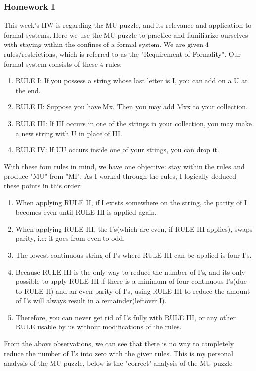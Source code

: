 \documentclass{article}
\theoremstyle{theorem}
\theoremstyle{definition}
\theoremstyle{remark}
\begin{document}
\subsubsection{Homework 1}
This week's HW is regarding the MU puzzle, and its relevance and application to formal systems. Here we use the MU puzzle to practice and familiarize ourselves with staying within the confines of a formal system. We are given 4 rules/restrictions, which is referred to as the "Requirement of Formality". 
Our formal system consists of these 4 rules:
\begin{enumerate}
    \item RULE I: If you possess a string whose last letter is I, you can add on a U at the end. 
    \item RULE II: Suppose you have Mx. Then you may add Mxx to your collection. 
    \item RULE III: If III occurs in one of the strings in your collection, you may make a new
string with U in place of III.
    \item RULE IV: If UU occurs inside one of your strings, you can drop it. 
\end{enumerate}
With these four rules in mind, we have one objective: stay within the rules and produce "MU" from "MI".
As I worked through the rules, I logically deduced these points in this order:
\begin{enumerate}
    \item When applying RULE II, if I exists somewhere on the string, the parity of I becomes even until RULE III is applied again.
    \item When applying RULE III, the I's(which are even, if RULE III applies), swaps parity, i.e: it goes from even to odd.
    \item The lowest continuous string of I's where RULE III can be applied is four I's.
    \item Because RULE III is the only way to reduce the number of I's, and its only possible to apply RULE III if there is a minimum of four continuous I's(due to RULE II) and an even parity of I's, using RULE III to reduce the amount of I's will always result in a remainder(leftover I).
    \item Therefore, you can never get rid of I's fully with RULE III, or any other RULE usable by us without modifications of the rules.
\end{enumerate}

From the above observations, we can see that there is no way to completely reduce the number of I's into zero with the given rules. This is my personal analysis of the MU puzzle, below is the "correct" analysis of the MU puzzle
\end{document}
